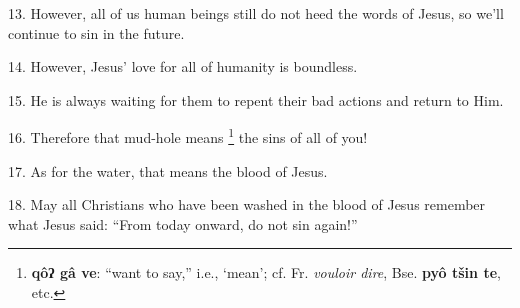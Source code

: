 13. However, all of us human beings still do not heed the words of Jesus, so we'll
continue to sin in the future.

14. However, Jesus' love for all of humanity is boundless.

15. He is always waiting for them to repent their bad actions and return to Him.

16. Therefore that mud-hole means \footnote{\textbf{qôʔ gâ ve}: ``want to say,'' i.e., `mean'; cf. Fr. \textit{vouloir dire}, Bse. \textbf{pyô tšin te}, etc.} the sins of all of you!

17. As for the water, that means the blood of Jesus.

18. May all Christians who have been washed in the blood of Jesus remember what
Jesus said: ``From today onward, do not sin again!''

